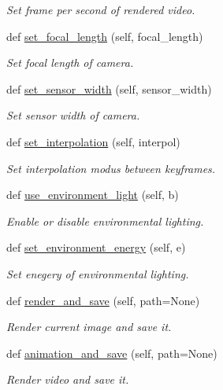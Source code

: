 \begin{DoxyCompactItemize}
\begin{DoxyCompactList}\small\item\em Set frame per second of rendered video. \end{DoxyCompactList}\item 
def \hyperlink{classhandler_1_1BlenderHandler_a9bacab8f5968c9d8611ca3f138a07d44}{set\+\_\+focal\+\_\+length} (self, focal\+\_\+length)
\begin{DoxyCompactList}\small\item\em Set focal length of camera. \end{DoxyCompactList}\item 
def \hyperlink{classhandler_1_1BlenderHandler_a3cc2cb039094ea02c6eda160d1240222}{set\+\_\+sensor\+\_\+width} (self, sensor\+\_\+width)
\begin{DoxyCompactList}\small\item\em Set sensor width of camera. \end{DoxyCompactList}\item 
def \hyperlink{classhandler_1_1BlenderHandler_af139c2e779c27473a4b85358b5df86c9}{set\+\_\+interpolation} (self, interpol)
\begin{DoxyCompactList}\small\item\em Set interpolation modus between keyframes. \end{DoxyCompactList}\item 
def \hyperlink{classhandler_1_1BlenderHandler_ae5e76e83e09fc173400b8c393ef27104}{use\+\_\+environment\+\_\+light} (self, b)
\begin{DoxyCompactList}\small\item\em Enable or disable environmental lighting. \end{DoxyCompactList}\item 
def \hyperlink{classhandler_1_1BlenderHandler_acf1f1e79abdcfb407510e429bc31149c}{set\+\_\+environment\+\_\+energy} (self, e)
\begin{DoxyCompactList}\small\item\em Set enegery of environmental lighting. \end{DoxyCompactList}\item 
def \hyperlink{classhandler_1_1BlenderHandler_a95d530555428c5af8106d18a34cd3721}{render\+\_\+and\+\_\+save} (self, path=None)
\begin{DoxyCompactList}\small\item\em Render current image and save it. \end{DoxyCompactList}\item 
def \hyperlink{classhandler_1_1BlenderHandler_a5fbc1bc58986c32ee7dedbc67cd3dcbe}{animation\+\_\+and\+\_\+save} (self, path=None)
\begin{DoxyCompactList}\small\item\em Render video and save it. \end{DoxyCompactList}\end{DoxyCompactItemize}
